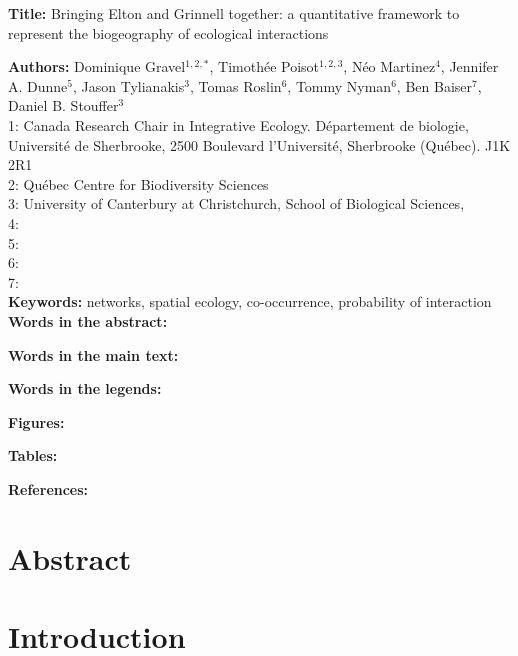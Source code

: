 \documentclass[12pt]{article}
\begin{document}
\linenumbers 
\modulolinenumbers[1]

\textbf{Title:} Bringing Elton and Grinnell together: a quantitative framework to represent the biogeography of ecological interactions

\textbf{Authors:} Dominique Gravel$^{1,2,*}$, Timoth\'ee Poisot$^{1,2,3}$, N\'eo
Martinez$^{4}$, Jennifer A. Dunne$^{5}$, Jason Tylianakis$^{3}$, Tomas Roslin$^{6}$, Tommy Nyman$^{6}$, Ben Baiser$^{7}$, Daniel B. Stouffer$^{3}$ \\

1: Canada Research Chair in Integrative Ecology. D\'epartement de
biologie, Universit\'e de Sherbrooke,  2500 Boulevard l'Universit\'e, 
Sherbrooke (Québec).  J1K 2R1\\

2: Qu\'ebec Centre for Biodiversity Sciences\\

3: University of Canterbury at Christchurch, School of Biological Sciences,\\

4: \\

5: \\

6:\\

7:\\

\textbf{Keywords:} networks, spatial ecology, co-occurrence, probability of interaction\\

\textbf{Words in the abstract:} 

\textbf{Words in the main text:} 

\textbf{Words in the legends:}  

\textbf{Figures:} 

\textbf{Tables:}     

\textbf{References:} 

\newpage
\doublespacing

\section*{Abstract} 

\newpage


\section*{Introduction}
\end{document}
